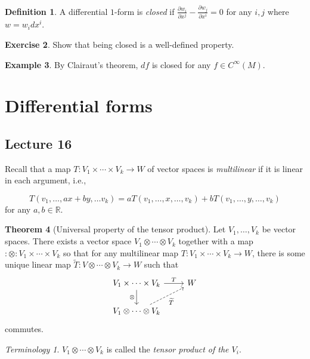 \documentclass[10pt,letterpaper,cm]{nupset}
\theoremstyle{definition}
\newtheorem{definition}{Definition}[subsection]
\newtheorem{exmp}[definition]{Example}
\theoremstyle{theorem}
\newtheorem{theorem}[definition]{Theorem}
\newtheorem{exercise}[definition]{Exercise}
\theoremstyle{remark}
\newtheorem*{term}{Terminology}
\newcommand{\R}{\mathbb R}
\newcommand{\1}{\mathbf{1}}
\newcommand{\0}{\vec 0}
\begin{document}
\begin{definition}
A differential $1$-form is \textit{closed} if $\frac{\partial{w_i}}{\partial{x^j}} - \frac{\partial{w_j}}{\partial{x^i}} =0$ for any $i,j$ where $w = w_i dx^i$.
\end{definition}

\begin{exercise}
Show that being closed is a well-defined property.
\end{exercise}

\begin{exmp}
By Clairaut's theorem, $df$ is closed for any $f\in C^{\infty}(M)$. 
\end{exmp}

\section{Differential forms}

\subsection{Lecture 16}

Recall that 
a map $T: V_1 \times \cdots \times V_k \to W$ of vector spaces is \textit{multilinear} if it is linear in each argument, i.e.,

\[
T(v_1, \ldots, ax+by, \ldots v_k) = aT(v_1, \ldots, x, \ldots, v_k) +   bT(v_1, \ldots, y, \ldots, v_k) 
\] for any $a,b\in \R$.



\begin{theorem}[Universal property of the tensor product]
Let $V_1, \ldots, V_k$ be vector spaces. There exists a vector space $V_1 \otimes \cdots \otimes V_k$ together with a map $:\otimes : V_1\times \cdots \times V_k$ so that for any multilinear map $T: V_1 \times \cdots \times V_k \to W$, there is some unique linear map $\widetilde{T} : V \otimes \cdots \otimes V_k \to W$ such that 
\[
\begin{tikzcd}
V_1 \times \cdots \times V_k \arrow[d, "\otimes"'] \arrow[r, "T"] & W \\
V_1 \otimes \cdots \otimes V_k \arrow[ru, "\widetilde{T}"', dashed] & 
\end{tikzcd}
\] commutes.
\end{theorem}

\begin{term}
$V_1 \otimes \cdots \otimes V_k$ is called the \textit{tensor product of the $V_i$}.
\end{term}
\end{document}
